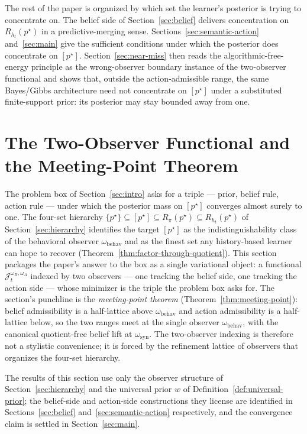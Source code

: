 \documentclass[11pt]{article}
\theoremstyle{definition}
\theoremstyle{remark}
\begin{document}
The rest of the paper is organized by which set the learner's posterior is trying to concentrate on. The belief side of Section~\ref{sec:belief} delivers concentration on $R_{h_t}(p^\star)$ in a predictive-merging sense. Sections~\ref{sec:semantic-action} and~\ref{sec:main} give the sufficient conditions under which the posterior does concentrate on $[p^\star]$. Section~\ref{sec:near-miss} then reads the algorithmic-free-energy principle as the wrong-observer boundary instance of the two-observer functional and shows that, outside the action-admissible range, the same Bayes/Gibbs architecture need not concentrate on $[p^\star]$ under a substituted finite-support prior: its posterior may stay bounded away from one.

\section{The Two-Observer Functional and the Meeting-Point Theorem}
\label{sec:functional}

The problem box of Section~\ref{sec:intro} asks for a triple --- prior, belief rule, action rule --- under which the posterior mass on $[p^\star]$ converges almost surely to one. The four-set hierarchy $\{p^\star\}\subseteq[p^\star]\subseteq R_\pi(p^\star)\subseteq R_{h_t}(p^\star)$ of Section~\ref{sec:hierarchy} identifies the target $[p^\star]$ as the indistinguishability class of the behavioral observer $\omega_{\mathrm{behav}}$ and as the finest set any history-based learner can hope to recover (Theorem~\ref{thm:factor-through-quotient}). This section packages the paper's answer to the box as a single variational object: a functional $\mathcal J_t^{\omega_B,\omega_A}$ indexed by two observers --- one tracking the belief side, one tracking the action side --- whose minimizer is the triple the problem box asks for. The section's punchline is the \emph{meeting-point theorem} (Theorem~\ref{thm:meeting-point}): belief admissibility is a half-lattice above $\omega_{\mathrm{behav}}$ and action admissibility is a half-lattice below, so the two ranges meet at the single observer $\omega_{\mathrm{behav}}$, with the canonical quotient-free belief lift at $\omega_{\mathrm{syn}}$. The two-observer indexing is therefore not a stylistic convenience; it is forced by the refinement lattice of observers that organizes the four-set hierarchy.

The results of this section use only the observer structure of Section~\ref{sec:hierarchy} and the universal prior $w$ of Definition~\ref{def:universal-prior}; the belief-side and action-side constructions they license are identified in Sections~\ref{sec:belief} and~\ref{sec:semantic-action} respectively, and the convergence claim is settled in Section~\ref{sec:main}.
\end{document}
